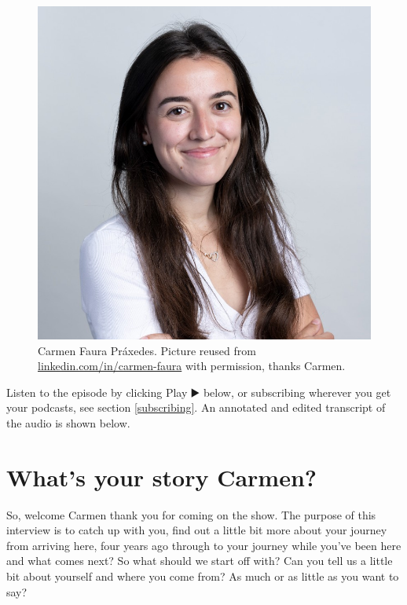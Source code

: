 \documentclass[
]{book}
\begin{document}
\begin{figure}

{\centering \includegraphics[width=1\linewidth]{images/carmen} 

}

\caption{Carmen Faura Práxedes. Picture reused from \href{https://www.linkedin.com/in/carmen-faura/}{linkedin.com/in/carmen-faura} with permission, thanks Carmen.}\label{fig:carmen-fig}
\end{figure}



Listen to the episode by clicking Play ▶️ below, or subscribing wherever you get your podcasts, see section \ref{subscribing}. An annotated and edited transcript of the audio is shown below.

\hypertarget{carmen-story}{%
\section{What's your story Carmen?}\label{carmen-story}}

So, welcome Carmen thank you for coming on the show. The purpose of this interview is to catch up with you, find out a little bit more about your journey from arriving here, four years ago through to your journey while you've been here and what comes next? So what should we start off with? Can you tell us a little bit about yourself and where you come from? As much or as little as you want to say?
\end{document}
